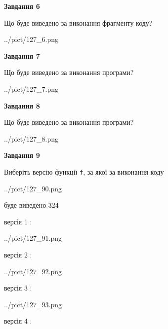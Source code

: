 \documentclass[12pt, ukrainian]{article}
\def\code#1{\Verb!#1!}
\begin{document}
{\begin {large}
{\begin {center}\textbf{Завдання 6}\end {center}}

Що буде виведено за виконання фрагменту коду?\par
\begin{center}
	{../pict/127_6.png}
\end{center}
\newpage

{\begin {center}\textbf{Завдання 7}\end {center}}

Що буде виведено за виконання програми?\par
\begin{center}
	{../pict/127_7.png}
\end{center}
\newpage

{\begin {center}\textbf{Завдання 8}\end {center}}

Що буде виведено за виконання програми?\par
\begin{center}
	{../pict/127_8.png}
\end{center}
\newpage

{\begin {center}\textbf{Завдання 9}\end {center}}

Виберіть версію функції \code{f}, за якої за виконання коду
\begin{center}
	{../pict/127_90.png}
\end{center}
буде виведено 324

\vspace{5mm}
версія 1 :

\begin{center}
	{../pict/127_91.png}
\end{center}
версія 2 :

\begin{center}
	{../pict/127_92.png}
\end{center}
версія 3 :

\begin{center}
	{../pict/127_93.png}
\end{center}
версія 4 :


\end{large}}
\end{document}
